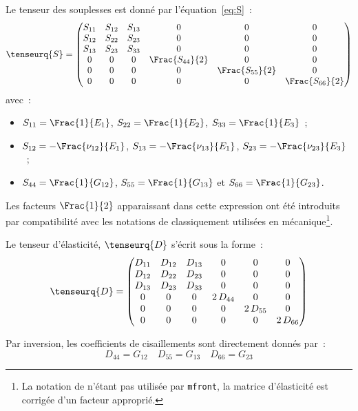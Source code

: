 \documentclass[rectoverso,pleiades,pstricks,leqno,anti]{texmf/note_technique_2010}
\newcommand{\mfront}{\texttt{mfront}}
\begin{document}
Le tenseur des souplesses est donné par l'équation~\eqref{eq:S}~:
\[
\tenseurq{S}=
\begin{pmatrix}
  S_{11} & S_{12} & S_{13} & 0 & 0 & 0 \\
  S_{12} & S_{22} & S_{23} & 0 & 0 & 0 \\
  S_{13} & S_{23} & S_{33} & 0 & 0 & 0 \\
  0 & 0 & 0 & \Frac{S_{44}}{2} & 0  & 0 \\
  0 & 0 & 0 & 0               & \Frac{S_{55}}{2} & 0 \\
  0 & 0 & 0 & 0               & 0 & \Frac{S_{66}}{2} \\
\end{pmatrix}
\]
avec~:
\begin{minipage}[t]{0.8\linewidth}
  \begin{itemize}
  \item \(S_{11} = \Frac{1}{E_{1}}\), \(S_{22} = \Frac{1}{E_{2}}\), \(S_{33} = \Frac{1}{E_{3}}\)~;
  \item \(S_{12} = -\Frac{\nu_{12}}{E_{1}}\), \(S_{13} = -\Frac{\nu_{13}}{E_{1}}\), \(S_{23} = -\Frac{\nu_{23}}{E_{3}}\)~;
  \item \(S_{44} = \Frac{1}{G_{12}}\),  \(S_{55} = \Frac{1}{G_{13}}\) et \(S_{66} = \Frac{1}{G_{23}}\).
  \end{itemize}
\end{minipage}

Les facteurs \(\Frac{1}{2}\) apparaissant dans cette expression ont
été introduits par compatibilité avec les notations de 
classiquement utilisées en mécanique\footnote{La notation de
   n'étant pas utilisée par \mfront{}, la matrice
  d'élasticité est corrigée d'un facteur approprié.}.

Le tenseur d'élasticité, \(\tenseurq{D}\) s'écrit sous la forme~:
\[
\tenseurq{D}=
\begin{pmatrix}
  D_{11} & D_{12} & D_{13} & 0 & 0 & 0 \\
  D_{12} & D_{22} & D_{23} & 0 & 0 & 0 \\
  D_{13} & D_{23} & D_{33} & 0 & 0 & 0 \\
  0 & 0 & 0 & 2\,D_{44} & 0  & 0 \\
  0 & 0 & 0 & 0        & 2\,D_{55} & 0 \\
  0 & 0 & 0 & 0        & 0 & 2\, D_{66} \\
\end{pmatrix}
\]

Par inversion, les coefficients de cisaillements sont directement
donnés par~:
\[
D_{44}=G_{12} \quad D_{55}=G_{13} \quad D_{66}=G_{23}
\]
\end{document}
